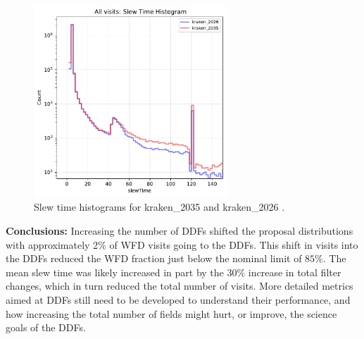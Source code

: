 \documentclass[DM,lsstdraft,authoryear,toc]{lsstdoc}
\begin{document}
\begin{figure}[ht]
\centering
\includegraphics[width=0.65\textwidth]{figures/kraken_2035_kraken_2026_Slew_Time_Histogram_All_visits_ONED_ComboBinnedData.pdf}
\caption{Slew time histograms for kraken\_2035 and kraken\_2026 .}
\label{fig:slew-2035}
\end{figure}

\textbf{Conclusions:} Increasing the number of DDFs shifted the proposal distributions with approximately 2$\%$ of WFD visits going
to the DDFs. This shift in visits into the DDFs reduced the WFD fraction just below the nominal limit of $85\%$. The mean slew time
was likely increased in part by the 30$\%$  increase in total filter changes, which in turn reduced the total number of visits. More detailed
metrics aimed at DDFs still need to be developed to understand their performance, and how increasing the total number of fields might
hurt, or improve, the science goals of the DDFs.
\end{document}
